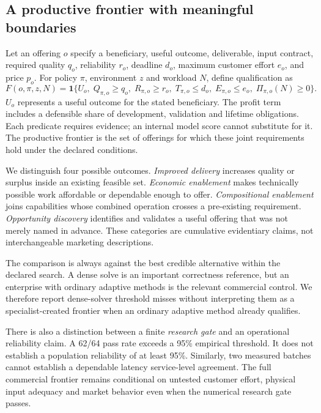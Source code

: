 \documentclass[11pt,letterpaper]{article}
\begin{document}
\begin{samepage}
\section{A productive frontier with meaningful boundaries}

Let an offering $o$ specify a beneficiary, useful outcome, deliverable, input contract, required quality $q_o$, reliability $r_o$, deadline $d_o$, maximum customer effort $e_o$, and price $p_o$. For policy $\pi$, environment $z$ and workload $N$, define qualification as
\begin{equation}
F(o,\pi,z,N)=\mathbf 1\{U_o,\;Q_{\pi,o}\geq q_o,\;R_{\pi,o}\geq r_o,\;T_{\pi,o}\leq d_o,\;E_{\pi,o}\leq e_o,\;\Pi_{\pi,o}(N)\geq0\}.
\end{equation}
$U_o$ represents a useful outcome for the stated beneficiary. The profit term includes a defensible share of development, validation and lifetime obligations. Each predicate requires evidence; an internal model score cannot substitute for it. The productive frontier is the set of offerings for which these joint requirements hold under the declared conditions.
\end{samepage}

We distinguish four possible outcomes. \emph{Improved delivery} increases quality or surplus inside an existing feasible set. \emph{Economic enablement} makes technically possible work affordable or dependable enough to offer. \emph{Compositional enablement} joins capabilities whose combined operation crosses a pre-existing requirement. \emph{Opportunity discovery} identifies and validates a useful offering that was not merely named in advance. These categories are cumulative evidentiary claims, not interchangeable marketing descriptions.

The comparison is always against the best credible alternative within the declared search. A dense solve is an important correctness reference, but an enterprise with ordinary adaptive methods is the relevant commercial control. We therefore report dense-solver threshold misses without interpreting them as a specialist-created frontier when an ordinary adaptive method already qualifies.

There is also a distinction between a finite \emph{research gate} and an operational reliability claim. A 62/64 pass rate exceeds a 95\% empirical threshold. It does not establish a population reliability of at least 95\%. Similarly, two measured batches cannot establish a dependable latency service-level agreement. The full commercial frontier remains conditional on untested customer effort, physical input adequacy and market behavior even when the numerical research gate passes.
\end{document}
